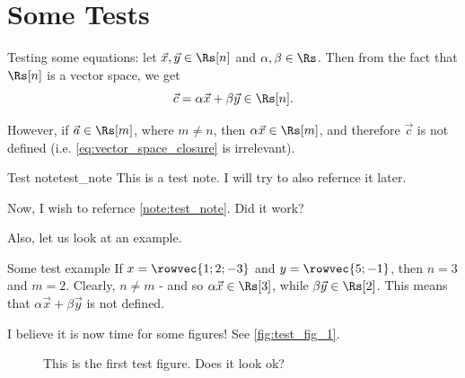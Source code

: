 \chapter{Some Tests}

Testing some equations: let $\vec{x},\vec{y}\in\Rs[n]$ and $\alpha,\beta\in\Rs$. Then from the fact that $\Rs[n]$ is a vector space, we get
\begin{equation}
	\vec{c} = \alpha\vec{x} + \beta\vec{y} \in \Rs[n].
	\label{eq:vector_space_closure}
\end{equation}

However, if $\vec{a}\in\Rs[m]$, where $m\neq n$, then $\alpha\vec{x}\in\Rs[m]$, and therefore $\vec{c}$ is not defined (i.e. \autoref{eq:vector_space_closure} is irrelevant).

\begin{note}{Test note}{test_note}
	This is a test note. I will try to also refernce it later.
\end{note}

Now, I wish to refernce \autoref{note:test_note}. Did it work?

Also, let us look at an example.

\begin{example}{Some test example}{}
	If $x=\rowvec{1;2;-3}$ and $y=\rowvec{5;-1}$, then $n=3$ and $m=2$. Clearly, $n\neq m$ - and so $\alpha\vec{x}\in\Rs[3]$, while $\beta\vec{y}\in\Rs[2]$. This means that $\alpha\vec{x}+\beta\vec{y}$ is not defined.
\end{example}

I believe it is now time for some figures! See \autoref{fig:test_fig_1}.

\begin{figure}
	\begin{center}
	\end{center}
	\caption{This is the first test figure. Does it look ok?}
	\label{fig:test_fig_1}
\end{figure}

